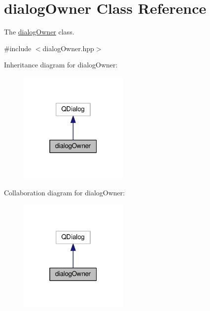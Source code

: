 \hypertarget{classdialogOwner}{}\section{dialog\+Owner Class Reference}
\label{classdialogOwner}


The \hyperlink{classdialogOwner}{dialog\+Owner} class.  




{\ttfamily \#include $<$dialog\+Owner.\+hpp$>$}



Inheritance diagram for dialog\+Owner\+:
\nopagebreak
\begin{figure}[H]
\begin{center}
\leavevmode
\includegraphics[width=151pt]{classdialogOwner__inherit__graph}
\end{center}
\end{figure}


Collaboration diagram for dialog\+Owner\+:
\nopagebreak
\begin{figure}[H]
\begin{center}
\leavevmode
\includegraphics[width=151pt]{classdialogOwner__coll__graph}
\end{center}
\end{figure}
